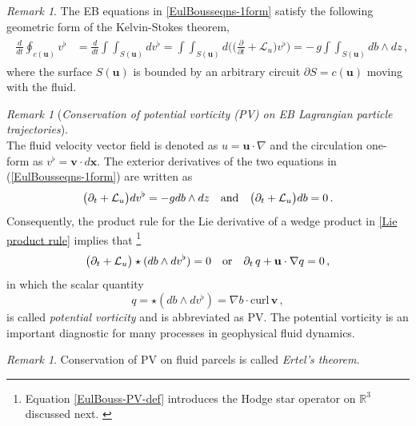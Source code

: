 \documentclass[11pt, oneside]{article}   	%
\numberwithin{equation}{section}
\theoremstyle{plain}
\theoremstyle{definition}
\theoremstyle{remark}
\newtheorem{remark}[theorem]{Remark}
\newcommand{\<}{\langle}
\renewcommand{\>}{\rangle}
\begin{document}
\begin{remark} \label{Stokes-thm-strat}
The EB equations in \eqref{EulBousseqns-1form} satisfy the following geometric form of the Kelvin-Stokes theorem,
\begin{align} 
\begin{split}
\frac{d}{dt}\oint_{c(\mathbf{u})} v^\flat
&=\frac{d}{dt}
\int\!\!\!\!\int_{S(\mathbf{u})} dv^\flat
=
\int\!\!\!\!\int_{S(\mathbf{u})}
d\bigg(
\Big(
\frac{\partial  }{\partial t} 
+ 
 \mathcal{L}_{u}
\Big)
v^\flat
\bigg)
= 
 - \, g
\int\!\!\!\!\int_{S(\mathbf{u})}
db\wedge dz 
\,,
\end{split}
 \label{Stokes-strat-geom}
\end{align} 
where the surface $S(\mathbf{u})$ is bounded by an arbitrary circuit $\partial S=c(\mathbf{u})$ moving with the fluid.  
\end{remark}


\begin{remark}[\emph{Conservation of  potential vorticity (PV) on EB Lagrangian particle trajectories}]$\,$\\
The fluid velocity vector field is denoted as $u=\mathbf{u}\cdot \nabla$ and the circulation one-form as $v^\flat=\mathbf{v}\cdot d\mathbf{x}$. 
The exterior derivatives of the two equations in (\ref{EulBousseqns-1form}) are written as
 \begin{equation}
\big(\partial_t +  \mathcal{L}_u\big)dv^\flat = -gdb\wedge dz
\quad\hbox{and}\quad
\big(\partial_t +  \mathcal{L}_u\big)db = 0
\,.
\label{EulBousseqns-2form}
\end{equation}
Consequently, the product rule for the Lie derivative of a wedge product in \eqref{Lie product rule} implies that%
\footnote{Equation \eqref{EulBouss-PV-def} introduces the Hodge star operator on $\mathbb{R}^3$ discussed next. \label{Hodge-Laplace-DeRham-sec}}
 \begin{equation}
\big(\partial_t +  \mathcal{L}_u\big)\star(db \wedge dv^\flat) = 0
\quad\hbox{or}\quad
\partial_t \,q
+
\mathbf{u}\cdot\nabla q 
=
0
\,,
\label{EulBousseqns-3form}
\end{equation}
in which the scalar quantity
 \begin{equation}
 q  = \star(db \wedge dv^\flat) =  \nabla b\cdot \mathrm{curl}\,\mathbf{v}
 \,,
\label{EulBouss-PV-def}
\end{equation}
is called \emph{potential vorticity} and is abbreviated as PV.
The potential vorticity is an important diagnostic for many processes in geophysical fluid dynamics. 
\begin{remark}
Conservation of PV on fluid parcels is called \emph{Ertel's theorem}.\end{remark} 
\end{remark}
\end{document}
